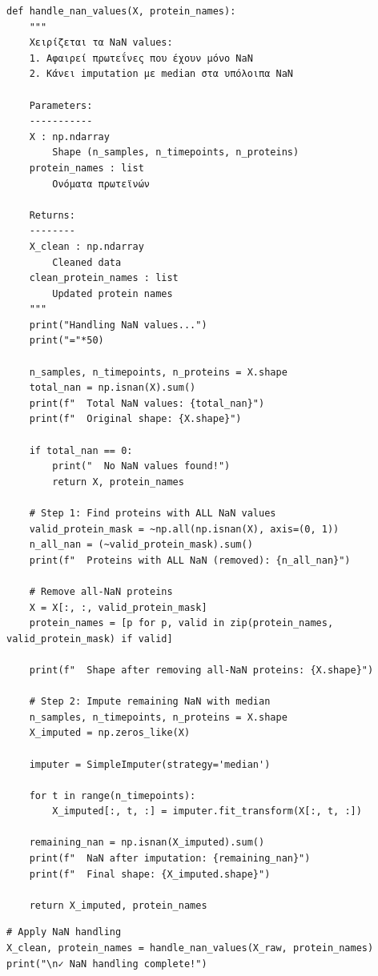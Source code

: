 \begin{lstlisting}
def handle_nan_values(X, protein_names):
    """
    Χειρίζεται τα NaN values:
    1. Αφαιρεί πρωτεΐνες που έχουν μόνο NaN
    2. Κάνει imputation με median στα υπόλοιπα NaN
 
    Parameters:
    -----------
    X : np.ndarray
        Shape (n_samples, n_timepoints, n_proteins)
    protein_names : list
        Ονόματα πρωτεϊνών
 
    Returns:
    --------
    X_clean : np.ndarray
        Cleaned data
    clean_protein_names : list
        Updated protein names
    """
    print("Handling NaN values...")
    print("="*50)
 
    n_samples, n_timepoints, n_proteins = X.shape
    total_nan = np.isnan(X).sum()
    print(f"  Total NaN values: {total_nan}")
    print(f"  Original shape: {X.shape}")
 
    if total_nan == 0:
        print("  No NaN values found!")
        return X, protein_names
 
    # Step 1: Find proteins with ALL NaN values
    valid_protein_mask = ~np.all(np.isnan(X), axis=(0, 1))
    n_all_nan = (~valid_protein_mask).sum()
    print(f"  Proteins with ALL NaN (removed): {n_all_nan}")
 
    # Remove all-NaN proteins
    X = X[:, :, valid_protein_mask]
    protein_names = [p for p, valid in zip(protein_names, valid_protein_mask) if valid]
 
    print(f"  Shape after removing all-NaN proteins: {X.shape}")
 
    # Step 2: Impute remaining NaN with median
    n_samples, n_timepoints, n_proteins = X.shape
    X_imputed = np.zeros_like(X)
 
    imputer = SimpleImputer(strategy='median')
 
    for t in range(n_timepoints):
        X_imputed[:, t, :] = imputer.fit_transform(X[:, t, :])
 
    remaining_nan = np.isnan(X_imputed).sum()
    print(f"  NaN after imputation: {remaining_nan}")
    print(f"  Final shape: {X_imputed.shape}")
 
    return X_imputed, protein_names
\end{lstlisting}
 
\begin{lstlisting}
# Apply NaN handling
X_clean, protein_names = handle_nan_values(X_raw, protein_names)
print("\n✓ NaN handling complete!")
\end{lstlisting}
 
